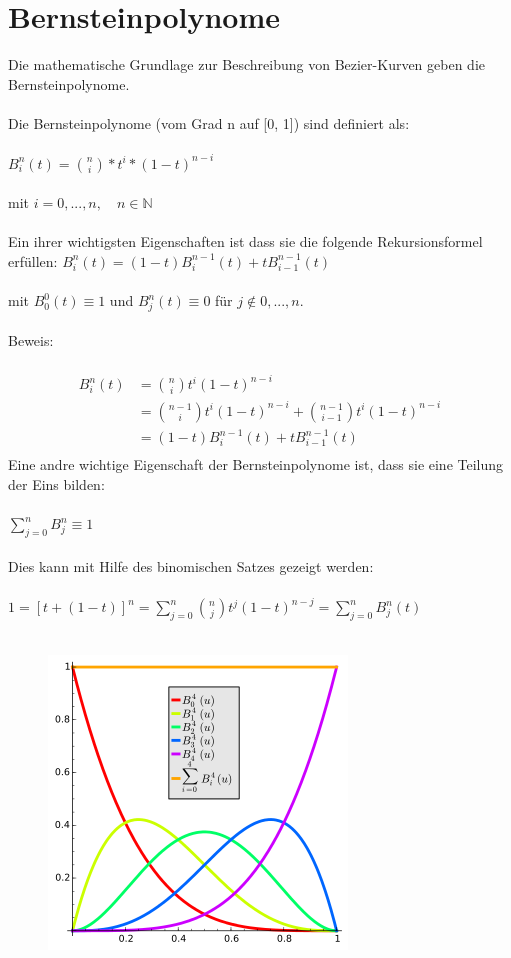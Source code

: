 \section{Bernsteinpolynome}
Die mathematische Grundlage zur Beschreibung von Bezier-Kurven geben die Bernsteinpolynome.\\ \\
Die Bernsteinpolynome (vom Grad n auf [0, 1]) sind definiert als:\\ \\
$B^{n}_{i}(t) = \binom{n}{i} * t^{i} * (1 - t)^{n - i}$\\ \\
mit $i = 0, ... , n, \quad n \in \mathbb{N}$\\ \\
Ein ihrer wichtigsten Eigenschaften ist dass sie die folgende Rekursionsformel erfüllen:
$B^{n}_{i}(t) = (1 - t)B^{n - 1}_{i}(t) + tB^{n - 1}_{i - 1}(t)$\\ \\
mit $B^{0}_{0}(t) \equiv{1}$ und $B^{n}_{j}(t) \equiv{0}$ für $j \notin {0, ... , n}$.\\ \\
Beweis:\\ \\
\begin{align*}
	B^{n}_{i}(t) &= \binom{n}{i}t^{i}(1 - t)^{n - i}\\
	&= \binom{n - 1}{i}t^{i}(1 -t)^{n - i} + \binom{n - 1}{i - 1}t^{i}(1 -t)^{n - i}\\
	&= (1 - t)B^{n - 1}_{i}(t) + tB^{n - 1}_{i - 1}(t)\\
\end{align*}
Eine andre wichtige Eigenschaft der Bernsteinpolynome ist, dass sie eine Teilung der Eins bilden:\\ \\
$\sum \limits_{j = 0}^{n}B^{n}_{j} \equiv{1}$\\ \\
Dies kann mit Hilfe des binomischen Satzes gezeigt werden:\\ \\
$1 = [t + (1 - t)]^{n} = \sum \limits_{j = 0}^{n}\binom{n}{j}t^{j}(1 - t)^{n - j} = \sum \limits_{j = 0}^{n}B^{n}_{j}(t)$\\ \\
\begin{figure}[h]
\centering
\includegraphics[width=0.5\linewidth]{images/Bernstein_Polynomials}
\caption{}
\label{fig:Bernstein_Polynomials}
\end{figure}
